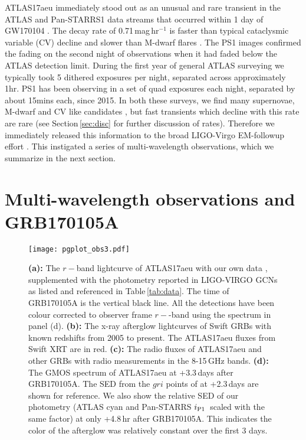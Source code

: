\documentclass[twocolumn]{aastex61}
\newcommand{\ips}{\ensuremath{i_{\rm P1}}}
\begin{document}
ATLAS17aeu immediately stood out as an unusual and rare transient in the ATLAS and Pan-STARRS1 data streams that occurred within 1 day of GW170104 \citep{GCN20382}. 
The decay rate of 0.71\,mag\,hr$^{-1}$ is faster than typical cataclysmic variable (CV) decline \citep{1975JBAA...86...30B} 
and slower than M-dwarf flares
\citep{2013ApJ...779...18B}. The PS1 images confirmed the fading on the second night of observations when it 
had faded below the ATLAS detection limit. 
During the first year of general ATLAS surveying we typically took 5 dithered exposures per night, separated across approximately 1hr.  PS1 has been observing in a set of quad exposures each night,  separated by about 15mins each, since 2015.  In both these surveys,  we
find many supernovae, M-dwarf and CV like candidates 
\citep{2016ATel.8680....1T}, but fast transients which decline with this rate are rare (see Section\,\ref{sec:disc} for further discussion of rates). Therefore we immediately 
released this information  \citep[in][]{GCN20382}  to the broad LIGO-Virgo EM-followup effort
\cite[see][]{2016ApJ...826L..13A}. This instigated a series of multi-wavelength observations, 
which we summarize in the next section. 

\section{Multi-wavelength observations and GRB170105A}
\label{sec:multiw}

\begin{figure*}
\texttt{[image: pgplot\_obs3.pdf]}
\caption{
{\bf (a):} The $r-$band lightcurve of ATLAS17aeu with our own data , supplemented with the
photometry reported in LIGO-VIRGO GCNs as listed 
and referenced in Table\,\ref{tab:data}. 
The time of GRB170105A is the vertical black line. All the detections have been colour corrected to observer frame $r-$-band using 
the spectrum in panel (d). 
{\bf (b):} The  x-ray afterglow lightcurves of Swift GRBs with known redshifts from 2005 to present. The ATLAS17aeu fluxes from Swift XRT are
in red. 
{\bf (c):}  The radio fluxes of ATLAS17aeu and other GRBs with radio measurements in the 8-15\,GHz bands. 
{\bf (d):}  The GMOS spectrum of ATLAS17aeu at +3.3\,days after GRB170105A. The 
SED from the $gri$ points of \cite{GCN20397}  at +2.3\,days
are shown for reference. We also show the relative SED
of our photometry (ATLAS cyan and Pan-STARRS \ips\, scaled with the same factor)
at only +4.8\,hr after GRB170105A. This indicates the color
of the afterglow was relatively constant over the first 3
days.  
}
\label{fig:lc}
\end{figure*}
\end{document}
